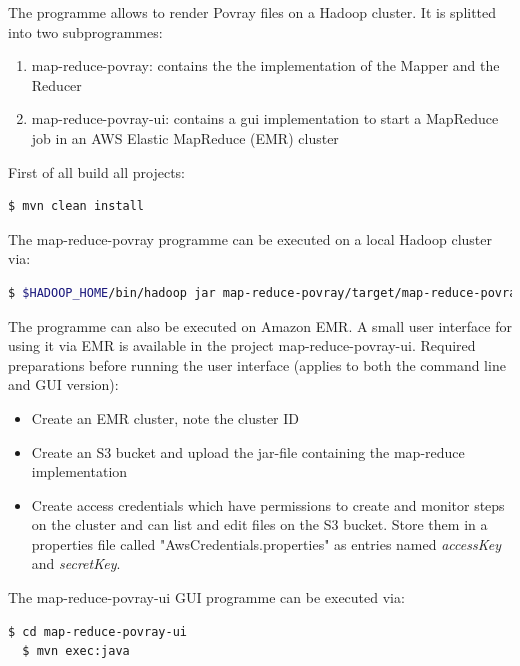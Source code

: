 \documentclass{article}
\begin{document}
The programme allows to render Povray files on a Hadoop cluster.
It is splitted into two subprogrammes:

\begin{enumerate}
\item map-reduce-povray: contains the the implementation of the Mapper and the Reducer
\item map-reduce-povray-ui: contains a gui implementation to start a MapReduce job in an AWS Elastic MapReduce (EMR) cluster
\end{enumerate}

First of all build all projects:

\begin{lstlisting}[language=bash, deletekeywords={cd}]
  $ mvn clean install
\end{lstlisting}

The map-reduce-povray programme can be executed on a local Hadoop cluster via:

\begin{lstlisting}[language=bash, deletekeywords={cd}]
  $ $HADOOP_HOME/bin/hadoop jar map-reduce-povray/target/map-reduce-povray-1.0.jar mapReducePovray.Povray <input-dir> <output-dir> <uri-of-pov-file>
\end{lstlisting}

The programme can also be executed on Amazon EMR. A small user interface for using it via EMR is available in the project map-reduce-povray-ui. Required preparations before running the user interface (applies to both the command line and GUI version):

\begin{itemize}
\item Create an EMR cluster, note the cluster ID
\item Create an S3 bucket and upload the jar-file containing the map-reduce implementation
\item Create access credentials which have permissions to create and monitor steps on the cluster and can list and edit files on the S3 bucket. Store them in a properties file called "AwsCredentials.properties" as entries named \emph{accessKey} and \emph{secretKey}.
\end{itemize}

The map-reduce-povray-ui GUI programme can be executed via:

\begin{lstlisting}[language=bash, deletekeywords={cd}]
  $ cd map-reduce-povray-ui
  $ mvn exec:java
\end{lstlisting}
\end{document}
